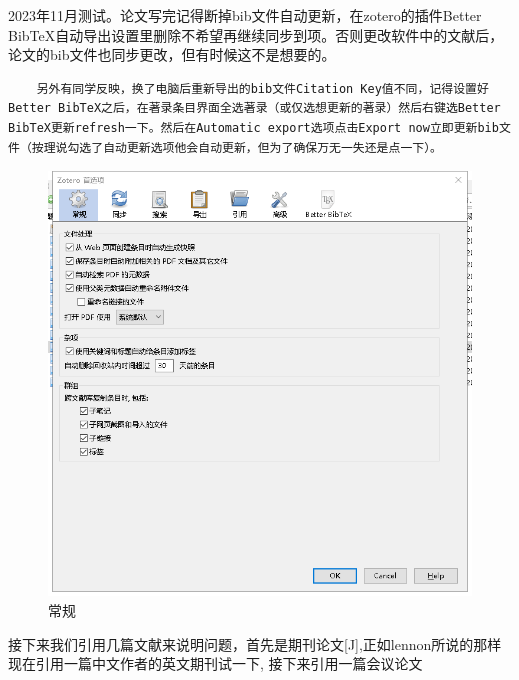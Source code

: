 2023年11月测试。论文写完记得断掉bib文件自动更新，在zotero的插件Better BibTeX自动导出设置里删除不希望再继续同步到项。否则更改软件中的文献后，论文的bib文件也同步更改，但有时候这不是想要的。
\begin{lstlisting}
    另外有同学反映，换了电脑后重新导出的bib文件Citation Key值不同，记得设置好Better BibTeX之后，在著录条目界面全选著录（或仅选想更新的著录）然后右键选Better BibTeX更新refresh一下。然后在Automatic export选项点击Export now立即更新bib文件（按理说勾选了自动更新选项他会自动更新，但为了确保万无一失还是点一下）。
\end{lstlisting}
\begin{figure}
	\centering
	\includegraphics[scale=0.8]{Fig/zotero1.png}
	\caption{\label{op1}常规}
\end{figure}
\clearpage
接下来我们引用几篇文献来说明问题，首先是期刊论文[J],正如lennon所说的那样
\cite{lennonScientificMachineLearning2023}
现在引用一篇中文作者的英文期刊试一下\cite{zhaoVersatileHydrogelDressing2023},
接下来引用一篇会议论文\cite{choLearningPhraseRepresentations2014}








